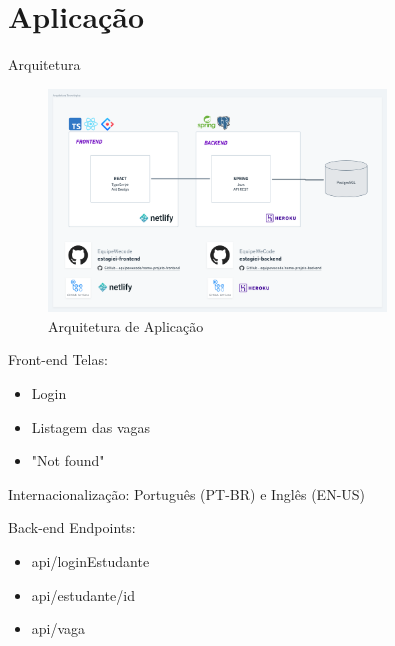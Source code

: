 \documentclass[%
    english,
    brazil]{ifsp-spo-beamer}
\begin{document}
%
%
\section{Aplicação}

%
%
\begin{frame}{Arquitetura} 
	\begin{figure}
		\centering
		\caption{\label{fig-arq-tec}Arquitetura de Aplicação}
		\includegraphics[width=0.8\textwidth]{../../imagens/arq-proj-arq-tec3.png}
	\end{figure}
\end{frame}

%
%
\begin{frame}{Front-end}
	Telas:
	\begin{itemize}
		\item Login
		\item Listagem das vagas
		\item "Not found"
	\end{itemize}

	Internacionalização: Português (PT-BR) e Inglês (EN-US)
\end{frame}

%
%
\begin{frame}{Back-end}
	Endpoints:
	\begin{itemize}
		\item api/loginEstudante
		\item api/estudante/{id}
		\item api/vaga
	\end{itemize}
	
\end{frame}
\end{document}
